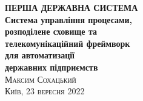 \frontmatter
\thispagestyle{empty}
\mbox{}\vspace{1in}
\noindent
\begin{flushright}
\vspace{0.5cm}
\textbf{\Huge ПЕРША ДЕРЖАВНА СИСТЕМА} \\
\vspace{0.5cm}
\textbf{\huge Система управління процесами, \\
        \huge розподілене сховище та \\
        \huge телекомунікаційний фреймворк \\
        \huge для автоматизації \\
        \huge державних підприємств \\
}
\vspace{1em}
\vspace{6cm}
\hfill{\Large\scshape{}Максим Сохацький}
\\
\vspace{0.3cm}
\hfill{\scshape{}Київ, 23 вересня 2022}
\end{flushright}
\cleartorecto
\tableofcontents*
\mainmatter
